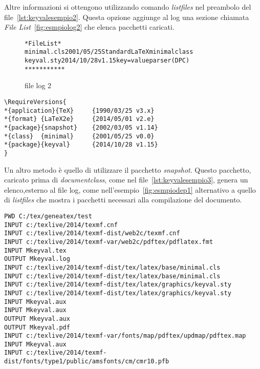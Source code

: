 Altre informazioni si ottengono utilizzando  comando \textit{listfiles} nel preambolo del file~\vref{lst:keyvalesempio2}. Questa opzione  aggiunge al log una sezione  chiamata \textit{File List}~\vref{fig:esmpiolog2} che elenca pacchetti caricati.
\begin{figure}
	\begin{alltt}
*File List*
minimal.cls    2001/05/25 Standard LaTeX minimal class
keyval.sty    2014/10/28 v1.15 key=value parser (DPC)
***********	\end{alltt}
	\captionsetup{name=Esempio}
	\caption{file log 2}
	\label{fig:esmpiolog2}
\end{figure}
 
\begin{lstlisting}[float,caption={Esempio di file dep},label=fig:esmpiodep1,captionpos=b,language=dep]
\RequireVersions{
*{application}{TeX}     {1990/03/25 v3.x}
*{format} {LaTeX2e}     {2014/05/01 v2.e}
*{package}{snapshot}    {2002/03/05 v1.14}
*{class}  {minimal}     {2001/05/25 v0.0}
*{package}{keyval}      {2014/10/28 v1.15}
}
\end{lstlisting}

Un altro metodo è quello di utilizzare il pacchetto \textit{snapshot}. Questo pacchetto, caricato prima di \textit{documentclass}, come nel file~\vref{lst:keyvalesempio3},  genera un elenco,esterno al file log, come nell'esempio~\vref{fig:esmpiodep1} alternativo a quello di \textit{listfiles} che mostra i pacchetti necessari alla compilazione del documento. 
\begin{lstlisting}[float,caption={Esempio di file fls},label=fig:esmpiofls1,captionpos=b,language=fls]
PWD C:/tex/geneatex/test
INPUT c:/texlive/2014/texmf.cnf
INPUT c:/texlive/2014/texmf-dist/web2c/texmf.cnf
INPUT c:/texlive/2014/texmf-var/web2c/pdftex/pdflatex.fmt
INPUT Mkeyval.tex
OUTPUT Mkeyval.log
INPUT c:/texlive/2014/texmf-dist/tex/latex/base/minimal.cls
INPUT c:/texlive/2014/texmf-dist/tex/latex/base/minimal.cls
INPUT c:/texlive/2014/texmf-dist/tex/latex/graphics/keyval.sty
INPUT c:/texlive/2014/texmf-dist/tex/latex/graphics/keyval.sty
INPUT Mkeyval.aux
INPUT Mkeyval.aux
OUTPUT Mkeyval.aux
OUTPUT Mkeyval.pdf
INPUT c:/texlive/2014/texmf-var/fonts/map/pdftex/updmap/pdftex.map
INPUT Mkeyval.aux
INPUT c:/texlive/2014/texmf-dist/fonts/type1/public/amsfonts/cm/cmr10.pfb
\end{lstlisting}

